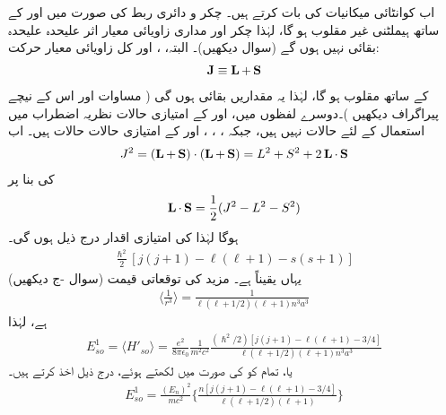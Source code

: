  اب کوانٹائی میکانیات کی بات کرتے ہیں۔ چکر و دائری ربط کی صورت میں  اور  کے ساتھ ہیملٹنی غیر مقلوب ہو گا، لہٰذا چکر اور مداری زاویائی معیار اثر علیحدہ علیحدہ بقائی نہیں ہوں گے (سوال  دیکھیں)۔ البتہ، ،  اور کل زاویائی معیار حرکت:
\begin{align}\label{مساوات_غیر_مضطرب_ایل_جمع_ایس_برابر_جے}
\operatorname{\mathbf{J}} \equiv \operatorname{\mathbf{L}} + \operatorname{\mathbf{S}}
\end{align}
کے ساتھ  مقلوب ہو گا، لہٰذا یہ مقداریں بقائی ہوں گی ( مساوات  اور اس کے نیچے پیراگراف دیکھیں )۔دوسرے لفظوں میں،  اور  کے امتیازی حالات نظریہ اضطراب میں استعمال کے لئے  حالات نہیں ہیں، جبکہ ، ، ، اور  کے امتیازی حالات  حالات ہیں۔ اب 
\begin{align*}
J^2 = (\operatorname{\mathbf{L}} + \operatorname{\mathbf{S}}) \cdot (\operatorname{\mathbf{L}} + \operatorname{\mathbf{S}}) = L^2 + S^2 + 2 \operatorname{\mathbf{L}} \cdot \operatorname{\mathbf{S}}
\end{align*}
کی بنا پر 
\begin{align}
\operatorname{\mathbf{L}} \cdot \operatorname{\mathbf{S}} = \frac{1}{2} (J^2 - L^2 - S^2)
\end{align}
ہوگا لہٰذا  کی امتیازی اقدار درج ذیل ہوں گی۔
\begin{align*}
\frac{\hslash^2}{2} [j (j + 1) - \ell (\ell + 1) - s(s + 1)]
\end{align*}
یہاں یقیناً  ہے۔ مزید  کی توقعاتی قیمت (سوال -ج دیکھیں) 
\begin{align}\label{مساوات_غیر_مضطرب_آر_تین}
\big\langle \frac{1}{r^3} \big\rangle = \frac{1}{\ell (\ell + 1/2) (\ell + 1) n^3 a^3} 
\end{align}
 ہے، لہٰذا 
\begin{align*}
E_{so}^1 = \langle H'_{so} \rangle = \frac{e^2}{8 \pi \epsilon_0} \frac{1}{m^2 c^2} \frac{(\hslash^2 /2) [j(j + 1) - \ell (\ell + 1) - 3/4]}{\ell (\ell + 1/2)(\ell + 1)n^3 a^3}
\end{align*} 
 یا، تمام کو  کی صورت میں لکھتے ہوئے، درج ذیل اخذ کرتے ہیں۔ 
\begin{align}\label{مساوات_غیر_مضطرب_چکر_و_مدار_ربط}
E^1_{so} = \frac{(E_n)^2}{mc^2} \Big \{ \frac{n[j(j + 1) - \ell (\ell + 1) - 3/4]}{\ell (\ell + 1/2)(\ell + 1)} \Big \}
\end{align}

